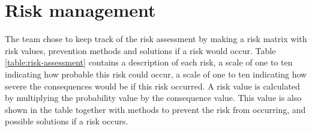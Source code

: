   
 



\section{Risk management}
The team chose to keep track of the risk assessment by making a risk matrix with risk values, prevention methods and solutions if a risk would occur. Table \ref{table:risk-assessment} contains a description of each risk, a scale of one to ten indicating how probable this risk could occur, a scale of one to ten indicating how severe the consequences would be if this risk occurred. A risk value is calculated by multiplying the probability value by the consequence value. This value is also shown in the table together with methods to prevent the risk from occurring, and possible solutions if a risk occurs.


